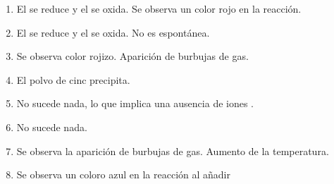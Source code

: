 \begin{changemargin}{1.5cm}{0cm}
\noindent
\begin{enumerate}
    \item El  se reduce y el  se oxida. Se observa un color rojo en la reacción.\\
    \item El  se reduce y el  se oxida. No es espontánea. \\
    \item Se observa color rojizo. Aparición de burbujas de gas.\\
    \item El polvo de cinc precipita.
    \item No sucede nada, lo que implica una ausencia de iones .
    \item No sucede nada.
    \item Se observa la aparición de burbujas de gas. Aumento de la temperatura.
    \item Se observa un coloro azul en la reacción al añadir  \\
\end{enumerate}
\end{changemargin}